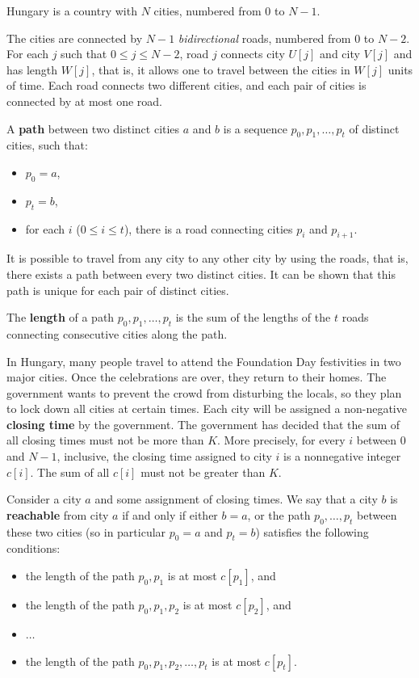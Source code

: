 
Hungary is a country with $N$ cities, numbered from $0$ to
$N - 1$.

The cities are connected by $N - 1$ \emph{bidirectional} roads,
numbered from $0$ to $N - 2$. For each $j$ such that
$0 \le j \le N - 2$, road $j$ connects city $U[j]$ and city
$V[j]$ and has length $W[j]$, that is, it allows one to travel
between the cities in $W[j]$ units of time. Each road connects two
different cities, and each pair of cities is connected by at most one
road.

A \textbf{path} between two distinct cities $a$ and $b$ is a
sequence $p_0, p_1, \ldots, p_t$ of distinct cities, such that:
\begin{itemize}
  \item $p_0 = a$,
  \item $p_t = b$,
  \item for each $i$ ($0 \le i \leq t$), there
  is a road connecting cities $p_i$ and $p_{i + 1}$.
\end{itemize}
It is possible to travel from any city to any other city by using the
roads, that is, there exists a path between every two distinct cities.
It can be shown that this path is unique for each pair of distinct
cities.

The \textbf{length} of a path $p_0, p_1, \ldots, p_t$ is the sum of
the lengths of the $t$ roads connecting consecutive cities along the
path.

In Hungary, many people travel to attend the Foundation Day festivities
in two major cities. Once the celebrations are over, they return to
their homes. The government wants to prevent the crowd from disturbing
the locals, so they plan to lock down all cities at certain times. Each
city will be assigned a non-negative \textbf{closing time} by the
government. The government has decided that the sum of all closing times
must not be more than $K$. More precisely, for every $i$ between
$0$ and $N - 1$, inclusive, the closing time assigned to city $i$
is a nonnegative integer $c[i]$. The sum of all $c[i]$ must not be
greater than $K$.

Consider a city $a$ and some assignment of closing times. We say that
a city $b$ is \textbf{reachable} from city $a$ if and only if either
$b = a$, or the path $p_0, \ldots, p_t$ between these two cities (so
in particular $p_0 = a$ and $p_t = b$) satisfies the following
conditions:
\begin{itemize}
  \item the length of the path $p_0, p_1$ is at most $c[p_1]$, and
  \item the length of the path $p_0, p_1, p_2$ is at most $c[p_2]$, and
  \item $\ldots$
  \item the length of the path $p_0, p_1, p_2, \ldots, p_t$ is at most $c[p_t]$.
\end{itemize}

